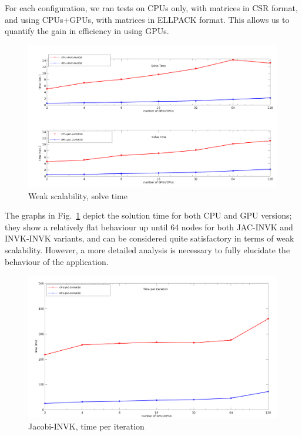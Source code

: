 For each configuration, we ran tests on CPUs only, with matrices in
CSR format, and using CPUs+GPUs, with matrices in ELLPACK format. This
allows us to quantify the gain in efficiency in using GPUs.   


\begin{figure}
\begin{center}
\includegraphics[width=\textwidth]{graf_solve_1.png}
\end{center}
\caption{Weak scalability, solve time\label{fig:solve_time}}
\end{figure}
The graphs in Fig.~\ref{fig:solve_time} depict the solution time for
both CPU and GPU versions; they show a relatively flat 
behaviour up until 64 nodes for both JAC-INVK and INVK-INVK variants,
and can be considered quite satisfactory in terms of weak scalability.
However, a more detailed analysis is necessary to fully elucidate the
behaviour of the application. 

\begin{figure}[h!]
\centering
\includegraphics[width=1\textwidth]{graf_time_per_it3a.png}
\caption{Jacobi-INVK, time per iteration\label{fig:time_per_it_a}}
\end{figure}


